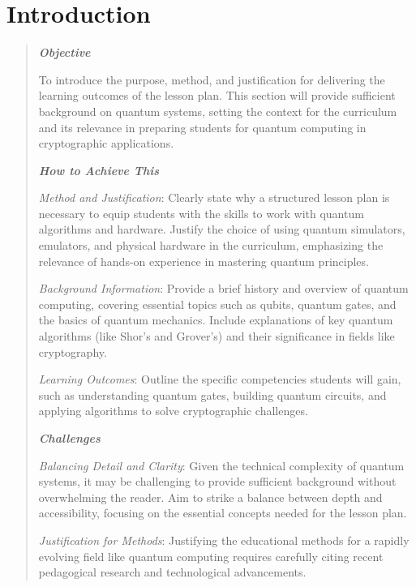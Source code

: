 \section{Introduction}

\begin{quote}\itshape
\textbf{\emph{Objective}}

To introduce the purpose, method, and justification for delivering the learning outcomes of the lesson plan. This section will provide sufficient background on quantum systems, setting the context for the curriculum and its relevance in preparing students for quantum computing in cryptographic applications.

\textbf{\emph{How to Achieve This}}

\emph{Method and Justification}: Clearly state why a structured lesson plan is necessary to equip students with the skills to work with quantum algorithms and hardware. Justify the choice of using quantum simulators, emulators, and physical hardware in the curriculum, emphasizing the relevance of hands-on experience in mastering quantum principles.

\emph{Background Information}: Provide a brief history and overview of quantum computing, covering essential topics such as qubits, quantum gates, and the basics of quantum mechanics. Include explanations of key quantum algorithms (like Shor’s and Grover’s) and their significance in fields like cryptography.

\emph{Learning Outcomes}: Outline the specific competencies students will gain, such as understanding quantum gates, building quantum circuits, and applying algorithms to solve cryptographic challenges.

\textbf{\emph{Challenges}}

\emph{Balancing Detail and Clarity}: Given the technical complexity of quantum systems, it may be challenging to provide sufficient background without overwhelming the reader. Aim to strike a balance between depth and accessibility, focusing on the essential concepts needed for the lesson plan.

\emph{Justification for Methods}: Justifying the educational methods for a rapidly evolving field like quantum computing requires carefully citing recent pedagogical research and technological advancements.
\end{quote}\ignorespacesafterend
